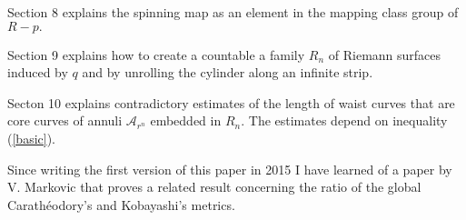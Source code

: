 \documentclass[12pt]{amsart}
\theoremstyle{remark}
\theoremstyle{definition}
\theoremstyle{definition}
\begin{document}
\begin{section}
Section 8 explains the spinning map as an element in the mapping class group of $R-p.$

Section 9 explains how to create a countable a family $R_n$ of Riemann surfaces induced by $q$ and by unrolling the cylinder along an infinite strip.

Secton 10 explains contradictory estimates of the length of waist curves that are core curves of annuli ${\mathcal A}_{r^n}$ embedded in $R_n.$  The estimates depend on inequality (\ref{basic}).


   Since writing the first version of this paper in 2015 I have learned of a paper \cite{Markovic3} by V. Markovic that proves a related result concerning the ratio of the global Carath\'eodory's and Kobayashi's metrics.   
   
   
   \end{section}
    
\end{document}
